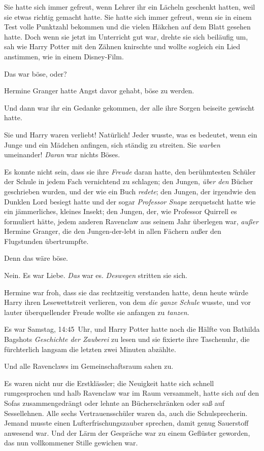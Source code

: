 Sie hatte sich immer gefreut, wenn Lehrer ihr ein Lächeln geschenkt hatten, weil sie etwas richtig gemacht hatte. Sie hatte sich immer gefreut, wenn sie in einem Test volle Punktzahl bekommen und die vielen Häkchen auf dem Blatt gesehen hatte. Doch wenn sie jetzt im Unterricht gut war, drehte sie sich beiläufig um, sah wie Harry Potter mit den Zähnen knirschte und wollte sogleich ein Lied anstimmen, wie in einem Disney-Film. 

Das war böse, oder? 

Hermine Granger hatte Angst davor gehabt, böse zu werden. 

Und dann war ihr ein Gedanke gekommen, der alle ihre Sorgen beiseite gewischt hatte. 

Sie und Harry waren verliebt! Natürlich! Jeder wusste, was es bedeutet, wenn ein Junge und ein Mädchen anfingen, sich ständig zu streiten. Sie \emph{warben} umeinander! \emph{Daran} war nichts Böses. 

Es konnte nicht sein, dass sie ihre \emph{Freude} daran hatte, den berühmtesten Schüler der Schule in jedem Fach vernichtend zu schlagen; den Jungen, \emph{über den} Bücher geschrieben wurden, und der wie ein Buch \emph{redete}; den Jungen, der irgendwie den Dunklen Lord besiegt hatte und der sogar \emph{Professor Snape} zerquetscht hatte wie ein jämmerliches, kleines Insekt; den Jungen, der, wie Professor Quirrell es formuliert hätte, jedem anderen Ravenclaw aus seinem Jahr überlegen war, \emph{außer} Hermine Granger, die den Jungen-der-lebt in allen Fächern außer den Flugstunden übertrumpfte. 

Denn das wäre böse. 

Nein. Es war Liebe. \emph{Das} war es. \emph{Deswegen} stritten sie sich. 

Hermine war froh, dass sie das rechtzeitig verstanden hatte, denn heute würde Harry ihren Lesewettstreit verlieren, von dem \emph{die ganze Schule} wusste, und vor lauter überquellender Freude wollte sie anfangen zu \emph{tanzen}. 

Es war Samstag, 14:45~Uhr, und Harry Potter hatte noch die Hälfte von Bathilda Bagshots \emph{Geschichte der Zauberei} zu lesen und sie fixierte ihre Taschenuhr, die fürchterlich langsam die letzten zwei Minuten abzählte. 

Und alle Ravenclaws im Gemeinschaftsraum sahen zu. 

Es waren nicht nur die Erstklässler; die Neuigkeit hatte sich schnell rumgesprochen und halb Ravenclaw war im Raum versammelt, hatte sich auf den Sofas zusammengedrängt oder lehnte an Bücherschränken oder saß auf Sessellehnen. Alle sechs Vertrauensschüler waren da, auch die Schulsprecherin. Jemand musste einen Lufterfrischungszauber sprechen, damit genug Sauerstoff anwesend war. Und der Lärm der Gespräche war zu einem Geflüster geworden, das nun vollkommener Stille gewichen war. 

